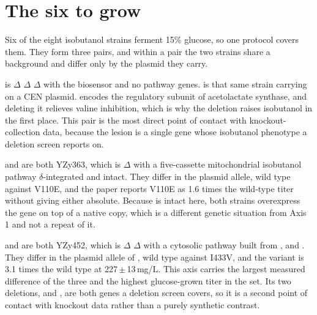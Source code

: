 
\section{The six to grow}\label{sec:selection}

Six of the eight isobutanol strains ferment 15\% glucose, so one protocol covers
them. They form three pairs, and within a pair the two strains share a background
and differ only by the plasmid they carry.



 is $\Delta$ $\Delta$ $\Delta$ with
the biosensor and no pathway genes.  is that same strain carrying
 on a CEN plasmid.  encodes the regulatory subunit of
acetolactate synthase, and deleting it relieves valine inhibition, which is why
the deletion raises isobutanol in the first place. This pair is the most direct
point of contact with knockout-collection data, because the lesion is a single
gene whose isobutanol phenotype a deletion screen reports on.

 and  are both YZy363, which is $\Delta$
with a five-cassette mitochondrial isobutanol pathway $\delta$-integrated and
 intact. They differ in the plasmid allele, wild type against V110E,
and the paper reports V110E as 1.6 times the wild-type titer without giving
either absolute. Because  is intact here, both strains overexpress the
gene on top of a native copy, which is a different genetic situation from Axis 1
and not a repeat of it.

 and  are both YZy452, which is $\Delta$
$\Delta$ with a cytosolic pathway built from
,  and . They differ
in the plasmid allele of , wild type against I433V, and the
variant is 3.1 times the wild type at 227\,$\pm$\,13\,mg/L. This axis carries the
largest measured difference of the three and the highest glucose-grown titer in
the set. Its two deletions,  and , are both genes a
deletion screen covers, so it is a second point of contact with knockout data
rather than a purely synthetic contrast.

